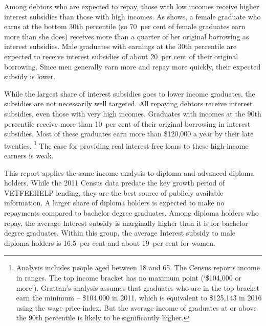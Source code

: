 \documentclass[embargoed]{grattan}
\begin{document}
Among debtors who are expected to repay, those with low incomes receive higher interest subsidies than those with high incomes.
As  shows, a female graduate who earns at the bottom 30{th} percentile (so 70~per cent of female graduates earn more than she does) receives more than a quarter of her original borrowing as interest subsidies.
Male graduates with earnings at the 30{th} percentile are expected to receive interest subsidies of about 20~per cent of their original borrowing.
Since men generally earn more and repay more quickly, their expected subsidy is lower.

While the largest share of interest subsidies goes to lower income graduates, the subsidies are not necessarily well targeted.
All repaying debtors receive interest subsidies, even those with very high incomes.
Graduates with incomes at the 90{th} percentile receive more than 10~per cent of their original borrowing in interest subsidies.
Most of these graduates earn more than \$120,000 a year by their late twenties.%
\footnote{Analysis includes people aged between 18 and 65.
The Census reports income in ranges.
The top income bracket has no maximum point (`\$104,000 or more').
Grattan's analysis assumes that graduates who are in the top bracket earn the minimum -- \$104,000 in 2011, which is equivalent to \$125,143 in 2016 using the wage price index.
But the average income of graduates at or above the 90{th} percentile is likely to be significantly higher.} The case for providing real interest-free loans to these high-income earners is weak.

\protect\hypertarget{_Ref312571851}{}{}This report applies the same income analysis to diploma and advanced diploma holders.
While the 2011 Census data predate the key growth period of \gls{VETFEEHELP} lending, they are the best source of publicly available information.
A larger share of diploma holders is expected to make no repayments compared to bachelor degree graduates.
Among diploma holders who repay, the average \gls{Interest subsidy} is marginally higher than it is for bachelor degree graduates.
Within this group, the average \gls{Interest subsidy} to male diploma holders is 16.5~per cent and about 19~per cent for women.
\end{document}
